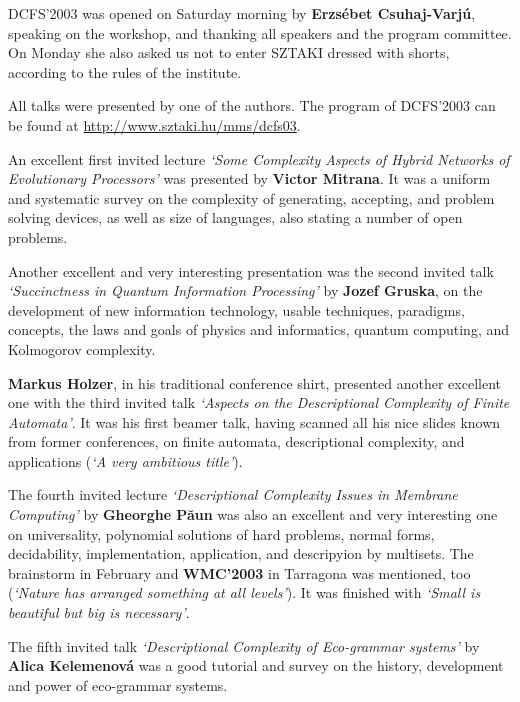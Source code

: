 \documentclass[final]{beatcs}
\begin{document}
{DCFS'2003} was opened on Saturday morning by 
 {\bf Erzs\'{e}bet Csuhaj-Varj\'{u}}, speaking on the workshop, and
 thanking all speakers and the program committee. On Monday she also
 asked us not to enter {SZTAKI} dressed with shorts, according to the
 rules of the institute.

\smallskip

 All talks were presented by one of the authors. The program of
 {DCFS'2003} can be found at \url{http://www.sztaki.hu/mms/dcfs03}.

\smallskip

An excellent first invited lecture {\it `Some Complexity Aspects
of Hybrid Networks of Evolutionary Processors'} was presented by
{\bf Victor Mitrana}. It was a uniform and systematic survey
 on the complexity of generating, accepting, and problem solving devices,
as well as size of languages, also stating a number of open problems.

Another excellent and very interesting presentation was the second
invited talk {\it `Succinctness in Quantum Information Processing'} by
{\bf Jozef Gruska}, on the development of new information
technology, usable techniques, paradigms, concepts, the laws and goals of
physics and informatics, quantum computing, and Kolmogorov complexity.

{\bf Markus Holzer}, in his traditional conference shirt, presented
another excellent one with the third invited talk {\it `Aspects on
the Descriptional Complexity of Finite Automata'}. It was his first
beamer talk, having scanned all his nice slides known
from former conferences, on finite automata, descriptional complexity, and
applications ({\it `A very ambitious title'}).

{\sloppy
 The fourth invited lecture {\it `Descriptional Complexity Issues in
Membrane Computing'} by {\bf Gheorghe P\u{a}un} was also an excellent
and very interesting one on universality, polynomial solutions of hard
problems, normal forms, decidability, implementation, application, and
descripyion by multisets.  The brainstorm in February and {\bf
  WMC'2003} in {Tarragona} was mentioned, too 
({\it `Nature has arranged something at all levels'}). 
 It was finished with 
{\it `Small is beautiful but big is necessary'}.\par}

The fifth invited talk {\it `Descriptional Complexity of Eco-grammar
systems'} by {\bf Alica Kelemenov\'{a}} was a good tutorial and survey
on the history, development and power of eco-grammar systems.
\end{document}
